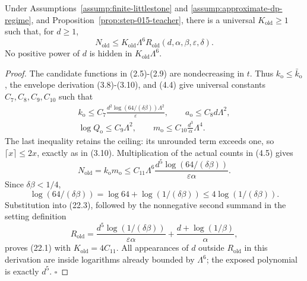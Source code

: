 \begin{proposition}\label{prop:step-015-rate}
Under Assumptions~\ref{assump:finite-littlestone} and
\ref{assump:approximate-dp-regime}, and
Proposition~\ref{prop:step-015-teacher}, there is a universal
\(K_{\mathrm{old}}\ge1\) such that, for \(d\ge1\),
\[
N_{\mathrm{old}}
\le K_{\mathrm{old}}\Lambda^6
R_{\mathrm{old}}(d,\alpha,\beta,\varepsilon,\delta).
\tag{22.1}
\]
No positive power of \(d\) is hidden in \(K_{\mathrm{old}}\Lambda^6\).


\end{proposition}

\begin{proof}
The candidate functions in (2.5)-(2.9) are nondecreasing in \(t\).
Thus \(k_{\mathrm o}\le\bar k_{\mathrm o}\), the envelope derivation
(3.8)-(3.10), and (4.4) give universal constants \(C_7,C_8,C_9,C_{10}\)
such that
\[
\begin{gathered}
k_{\mathrm o}\le
C_7\frac{d^2\log(64/(\delta\beta))\Lambda^2}{\varepsilon},
\qquad
a_{\mathrm o}\le C_8d\Lambda^2,\\
\log Q_{\mathrm o}\le C_9\Lambda^2,\qquad
m_{\mathrm o}\le
C_{10}\frac{d^3}{\alpha}\Lambda^4.
\end{gathered}
\tag{22.2}
\]
The last inequality retains the ceiling: its unrounded term exceeds one,
so \(\lceil x\rceil\le2x\), exactly as in (3.10).
Multiplication of the actual counts in (4.5) gives
\[
N_{\mathrm{old}}=k_{\mathrm o}m_{\mathrm o}
\le C_{11}\Lambda^6
\frac{d^5\log(64/(\delta\beta))}
{\varepsilon\alpha}.
\tag{22.3}
\]
Since \(\delta\beta<1/4\),
\[
\log(64/(\delta\beta))
=\log64+\log(1/(\delta\beta))
\le4\log(1/(\delta\beta)).
\tag{22.4}
\]
Substitution into (22.3), followed by the nonnegative second summand in
the setting definition
\[
R_{\mathrm{old}}
=\frac{d^5\log(1/(\delta\beta))}{\varepsilon\alpha}
+\frac{d+\log(1/\beta)}{\alpha},
\]
proves (22.1) with \(K_{\mathrm{old}}=4C_{11}\).
All appearances of \(d\) outside \(R_{\mathrm{old}}\) in this derivation
are inside logarithms already bounded by \(\Lambda^6\); the exposed
polynomial is exactly \(d^5\). \(\square\)


\end{proof}

